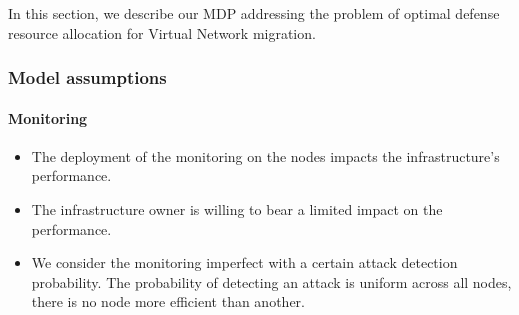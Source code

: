 \label{sec:mdp-model}
In this section, we describe our MDP addressing the problem of optimal defense resource allocation for Virtual Network migration.

\subsubsection{Model assumptions}
\label{sec:mdp-model-assumption}

\paragraph{Monitoring}
\begin{itemize}
    \item The deployment of the monitoring on the nodes impacts the infrastructure's performance. 
    
    \item The infrastructure owner is willing to bear a limited impact on the performance.
    
    \item We consider the monitoring imperfect with a certain attack detection probability.
    The probability of detecting an attack is uniform across all nodes, \ie there is no node more efficient than another. 
\end{itemize}


